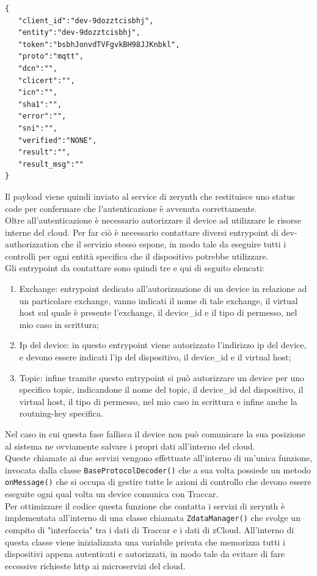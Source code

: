 \documentclass[a4paper,titlepage,12pt]{book}
\begin{document}
\begin{verbatim}
{
   "client_id":"dev-9dozztcisbhj",
   "entity":"dev-9dozztcisbhj",
   "token":"bsbhJonvdTVFgvkBH98JJKnbkl",
   "proto":"mqtt",
   "dcn":"",
   "clicert":"",
   "icn":"",
   "sha1":"",
   "error":"",
   "sni":"",
   "verified":"NONE",
   "result":"",
   "result_msg":""
}

\end{verbatim}

\noindent Il payload viene quindi inviato al service di zerynth che restituisce uno status code per confermare che l'autenticazione è avvenuta correttamente.\\
Oltre all'autenticazione è necessario autorizzare il device ad utilizzare le risorse interne del cloud. Per far ciò è necessario contattare diversi entrypoint di dev-authorizzation che il servizio stesso espone, in modo tale da eseguire tutti i controlli per ogni entità specifica che il dispositivo potrebbe utilizzare.
\\Gli entrypoint da contattare sono quindi tre e qui di seguito elencati:

\begin{enumerate}
\item Exchange: entrypoint dedicato all'autorizzazione di un device in relazione ad un particolare exchange, vanno indicati il nome di tale exchange, il virtual host sul quale è presente l'exchange, il device\_id e il tipo di permesso, nel mio caso in scrittura;

\item Ip del device: in questo entrypoint viene autorizzato l'indirizzo ip del device, e devono essere indicati l'ip del dispositivo, il device\_id e il virtual host;

\item Topic: infine tramite questo entrypoint si può autorizzare un device per uno specifico topic, indicandone il nome del topic, il device\_id del dispositivo, il virtual host, il tipo di permesso, nel mio caso in scrittura e infine anche la routning-key specifica.

\end{enumerate}


Nel caso in cui questa fase fallisca il device non può comunicare la sua posizione al sistema ne ovviamente salvare i propri dati all'interno del cloud. \\
Queste chiamate ai due servizi vengono effettuate all'interno di un'unica funzione, invocata dalla classe \texttt{BaseProtocolDecoder()} che a sua volta possiede un metodo \texttt{onMessage()} che si occupa di gestire tutte le azioni di controllo che devono essere eseguite ogni qual volta un device comunica con Traccar.\\
Per ottimizzare il codice questa funzione che contatta i servizi di zerynth è implementata all'interno di una classe chiamata \texttt{ZdataManager()} che svolge un compito di "interfaccia" tra i dati di Traccar e i dati di zCloud. All'interno di questa classe viene inizializzata una variabile privata che memorizza tutti i dispositivi appena autenticati e autorizzati, in modo tale da evitare di fare eccessive richieste http ai microservizi del cloud.\\
\end{document}
